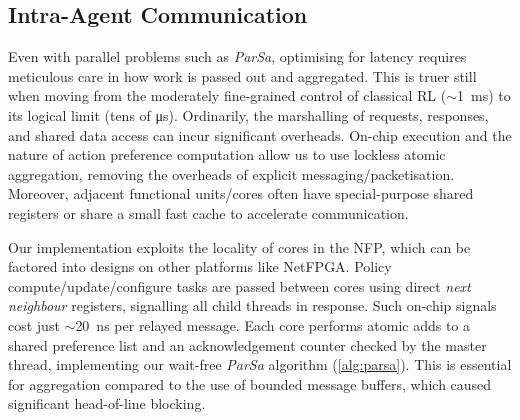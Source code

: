 \subsection{Intra-Agent Communication}\label{sec:intra-agent-communication}
Even with parallel problems such as \emph{ParSa}, optimising for latency requires meticulous care in how work is passed out and aggregated.
This is truer still when moving from the moderately fine-grained control of classical RL ($\sim$\qty{1}{\milli\second}) to its logical limit (tens of \si{\micro\second}).
Ordinarily, the marshalling of requests, responses, and shared data access can incur significant overheads.
On-chip execution and the nature of action preference computation allow us to use lockless atomic aggregation, removing the overheads of explicit messaging/packetisation.
Moreover, adjacent functional units/cores often have special-purpose shared registers or share a small fast cache to accelerate communication.


Our implementation exploits the locality of cores in the NFP, which can be factored into designs on other platforms like NetFPGA.
Policy compute/update/configure tasks are passed between cores using direct \emph{next neighbour} registers, signalling all child threads in response.
Such on-chip signals cost just $\sim$\qty{20}{\nano\second} per relayed message.
Each core performs atomic adds to a shared preference list and an acknowledgement counter checked by the master thread, implementing our wait-free \emph{ParSa} algorithm (\cref{alg:parsa}).
This is essential for aggregation compared to the use of bounded message buffers, which caused significant head-of-line blocking.

%

